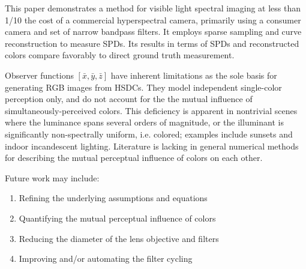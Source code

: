\documentclass[twocolumn,10pt]{asme2ej}
\newcommand{\id}{\hspace{6 mm}}
\begin{document}
This paper demonstrates a method for visible light spectral imaging at less than 1/10 the cost of a commercial hyperspectral camera, primarily using a consumer camera and set of narrow bandpass filters. It employs sparse sampling and curve reconstruction to measure SPDs. Its results in terms of SPDs and reconstructed colors compare favorably to direct ground truth measurement.

\id Observer functions $[ \bar{x}, \bar{y}, \bar{z} ]$ have inherent limitations as the sole basis for generating RGB images from HSDCs. They model independent single-color perception only, and do not account for the the mutual influence of simultaneously-perceived colors. This deficiency is apparent in nontrivial scenes where the luminance spans several orders of magnitude, or the illuminant is significantly non-spectrally uniform, i.e. colored; examples include sunsets and indoor incandescent lighting. Literature is lacking in general numerical methods for describing the mutual perceptual influence of colors on each other.

\id Future work may include:

\begin{enumerate}
\item Refining the underlying assumptions and equations
\item Quantifying the mutual perceptual influence of colors
\item Reducing the diameter of the lens objective and filters 
\item Improving and/or automating the filter cycling
\end{enumerate}

\end{document}
